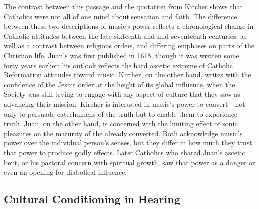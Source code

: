 The contrast between this passage and the quotation from Kircher shows that
Catholics were not all of one mind about sensation and faith.
The difference between these two descriptions of music's power reflects  a
chronological change in Catholic attitudes between the late sixteenth and mid
seventeenth centuries, as well as a contrast between religious orders, and
differing emphases on parts of the Christian life.
Juan's  was first published in 1618, though it
was written some forty years earlier; his outlook reflects the hard ascetic
extreme of Catholic Reformation attitudes toward music.
Kircher, on the other hand, writes with the confidence of the Jesuit order at
the height of its global influence, when the Society was still trying to engage
with any aspect of culture that they saw as advancing their mission.
Kircher is interested in music's power to convert---not only to persuade
catechumens of the truth but to enable them to experience truth.
Juan, on the other hand, is concerned with the limiting effect of sonic
pleasures on the maturity of the already converted.
Both acknowledge music's power over the individual person's senses, but they
differ in how much they trust that power to produce godly effects.
Later Catholics who shared Juan's ascetic bent, or his pastoral concern with
spiritual growth, saw that power as a danger or even an opening for diabolical
influence.


\subsection{Cultural Conditioning in Hearing}


